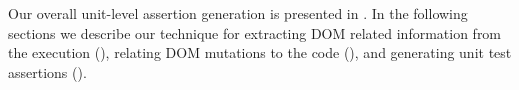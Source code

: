 Our overall unit-level assertion generation is presented in . In the following sections we describe our technique for extracting DOM related information from the execution (), relating
DOM mutations to the \javascript code (), and generating unit test assertions ().   


         
